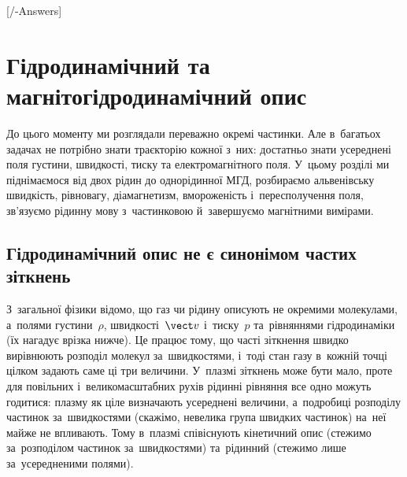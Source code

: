

\graphicspath{{\currfilebase/Pictures}}

[\currfilebase/\currfilebase-Answers]
\chapter{Гідродинамічний та магнітогідродинамічний опис}\label{sec:mhd}
\label{\currfilebase}\hypertarget{mhd}{}

До цього моменту ми розглядали переважно окремі частинки. Але в~багатьох задачах не потрібно знати
траєкторію кожної з~них: достатньо знати усереднені поля густини, швидкості, тиску та
електромагнітного поля. У~цьому розділі ми піднімаємося від двох рідин до однорідинної МГД,
розбираємо альвенівську швидкість, рівновагу, діамагнетизм, вмороженість і~пересполучення поля, зв'язуємо рідинну мову з~частинковою
й~завершуємо магнітними вимірами.


\section{Гідродинамічний опис не є синонімом частих зіткнень}


З~загальної фізики відомо, що газ чи рідину описують не окремими молекулами, а~полями густини~$\rho$,
швидкості~$\vect v$ і~тиску~$p$ та~рівняннями гідродинаміки (їх нагадує врізка нижче). Це працює тому, що часті
зіткнення швидко вирівнюють розподіл молекул за~швидкостями, і~тоді стан газу в~кожній точці цілком задають
саме ці три величини. У~плазмі зіткнень може бути мало, проте для повільних
і~великомасштабних рухів рідинні рівняння все одно можуть годитися: плазму як ціле визначають усереднені
величини, а~подробиці розподілу частинок за~швидкостями (скажімо, невелика група швидких частинок) на~неї
майже не впливають. Тому в~плазмі співіснують кінетичний опис (стежимо за~розподілом частинок
за~швидкостями) та~рідинний (стежимо лише за~усередненими полями).

